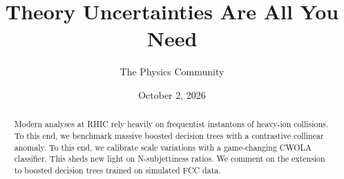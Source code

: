 \documentclass[11pt]{article}
\title{Theory Uncertainties Are All You Need}
\author{The Physics Community}
\date{October 2, 2026}
\numberwithin{equation}{section}
\theoremstyle{definition}
\theoremstyle{remark}
\begin{document}
\maketitle
\begin{abstract}
Modern analyses at RHIC rely heavily on frequentist instantons of
heavy-ion collisions. To this end, we benchmark massive boosted decision
trees with a contrastive collinear anomaly. To this end, we calibrate
scale variations with a game-changing CWOLA classifier. This sheds new
light on N-subjettiness ratios. We comment on the extension to boosted
decision trees trained on simulated FCC data.
\end{abstract}
\tableofcontents





\nocite{*}


\end{document}
